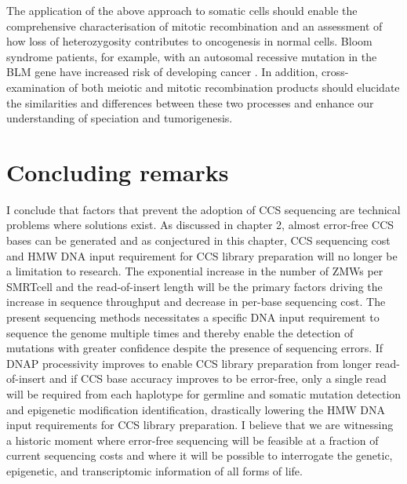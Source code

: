 The application of the above approach to somatic cells should enable the comprehensive characterisation of mitotic recombination and an assessment of how loss of heterozygosity contributes to oncogenesis in normal cells. Bloom syndrome patients, for example, with an autosomal recessive mutation in the BLM gene have increased risk of developing cancer \cite{Gruber2002-ck}. In addition, cross-examination of both meiotic and mitotic recombination products should elucidate the similarities and differences between these two processes and enhance our understanding of speciation and tumorigenesis. 

\section{Concluding remarks}

I conclude that factors that prevent the adoption of CCS sequencing are technical problems where solutions exist. As discussed in chapter 2, almost error-free CCS bases can be generated and as conjectured in this chapter, CCS sequencing cost and HMW DNA input requirement for CCS library preparation will no longer be a limitation to research. The exponential increase in the number of ZMWs per SMRTcell and the read-of-insert length will be the primary factors driving the increase in sequence throughput and decrease in per-base sequencing cost. The present sequencing methods necessitates a specific DNA input requirement to sequence the genome multiple times and thereby enable the detection of mutations with greater confidence despite the presence of sequencing errors. If DNAP processivity improves to enable CCS library preparation from longer read-of-insert and if CCS base accuracy improves to be error-free, only a single read will be required from each haplotype for germline and somatic mutation detection and epigenetic modification identification, drastically lowering the HMW DNA input requirements for CCS library preparation. I believe that we are witnessing a historic moment where error-free sequencing will be feasible at a fraction of current sequencing costs and where it will be possible to interrogate the genetic, epigenetic, and transcriptomic information of all forms of life.  









